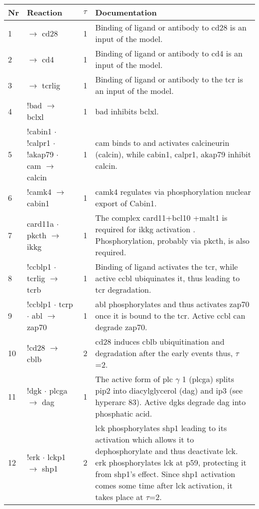\documentclass[a4paper, 12pt,epsfig, onecolumn]{article}
\newcommand{\mydot}{\hspace{-0mm} $\cdot$  \hspace{-0mm}}
\begin{document}
{\begin{center}
\begin{longtable}{|p{}|p{}|p{}|p{}|}
\textbf{Nr} & \textbf{Reaction} & \textbf{$\tau$} & \textbf{Documentation} \\ \endhead  \hline
1&       $\rightarrow$ cd28 &1& Binding of ligand or antibody to cd28 is an input of the model. \\ \hline
2&       $\rightarrow$ cd4  &1& Binding of ligand or antibody to cd4 is an input of the model. \\ \hline
3&     $\rightarrow$ tcrlig &1& Binding of ligand or antibody to the tcr is an input of the model. \\ \hline
4& !bad $\rightarrow$ bclxl               &1& bad inhibits bclxl\cite{zha:1997,yang:1995}. \\ \hline
5& !cabin1\mydot !calpr1\mydot !akap79\mydot cam $\rightarrow$        calcin  &1&  cam binds to and activates calcineurin (calcin), while  cabin1, calpr1, akap79 inhibit calcin\cite{Matsuda_EMBO_2000,ryeom:2003,Kashishian_JBC_1998}. \\ \hline
6& !camk4 $\rightarrow$ cabin1                              &1& camk4 regulates via phosphorylation nuclear export of Cabin1\cite{pan:2005}. \\ \hline
7& card11a \mydot pkcth $\rightarrow$ ikkg  &1& The complex card11+bcl10 +malt1 is required for ikkg activation \cite{Thome_NatRevImm_2004,weil:2006,MatthewS}. Phosphorylation, probably via pkcth\cite{khoshnan:2000}, is also required.\\ \hline
8& !ccblp1\mydot tcrlig $\rightarrow$ tcrb  &1& Binding        of ligand activates the tcr, while active ccbl ubiquinates it, thus        leading to tcr degradation\cite{Huang_JBC_04}. \\ \hline
9& !ccblp1\mydot tcrp\mydot abl $\rightarrow$ zap70            &1& abl phosphorylates and thus activates zap70\cite{ZipfelPA_CurrBiol_04} once it is bound to the tcr. Active ccbl  \phantom{\emph{}} can degrade zap70. \\ \hline
10& !cd28 $\rightarrow$ cblb               &2& cd28 induces cblb ubiquitination and degradation\cite{ZhangJ_JImm_02} after the early events thus, $\tau$=2. \\ \hline
11& !dgk\mydot plcga $\rightarrow$ dag &1& The active form of plc $\gamma$ 1 (plcga) splits pip2 into diacylglycerol (dag) and ip3 (see hyperarc 83)\cite{Huang_JBC_04}. Active dgks degrade dag into phosphatic acid\cite{TophamMK_JCB_06}. \\ \hline
12& !erk\mydot lckp1 $\rightarrow$ shp1                           &2& lck phosphorylates shp1 leading to its activation which allows it to dephosphorylate and thus deactivate lck. erk phosphorylates lck at p59, protecting it from shp1's effect\cite{StefanovaI_Nature_02,Altan-Bonnet_PLoSBiol_05}. Since shp1 activation comes some time after lck activation, it takes place at $\tau$=2. \\ \hline

\end{longtable}
\end{center}}
\end{document}
